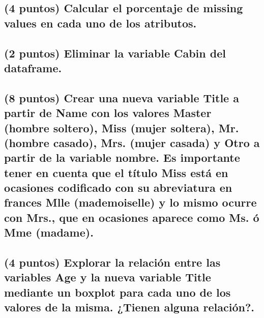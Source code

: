 \documentclass[]{article}
\begin{document}
\subsection{(4 puntos) Calcular el porcentaje de missing values en cada
uno de los
atributos.}\label{puntos-calcular-el-porcentaje-de-missing-values-en-cada-uno-de-los-atributos.}

\subsection{\texorpdfstring{(2 puntos) Eliminar la variable
\textbf{Cabin} del
dataframe.}{(2 puntos) Eliminar la variable Cabin del dataframe.}}\label{puntos-eliminar-la-variable-cabin-del-dataframe.}

\subsection{\texorpdfstring{(8 puntos) Crear una nueva variable
\textbf{Title} a partir de \textbf{Name} con los valores \textbf{Master}
(hombre soltero), \textbf{Miss} (mujer soltera), \textbf{Mr.} (hombre
casado), \textbf{Mrs.} (mujer casada) y Otro a partir de la variable
\textbf{nombre}. Es importante tener en cuenta que el título
\textbf{Miss} está en ocasiones codificado con su abreviatura en frances
\textbf{Mlle} (mademoiselle) y lo mismo ocurre con \textbf{Mrs.}, que en
ocasiones aparece como \textbf{Ms.} ó \textbf{Mme}
(madame).}{(8 puntos) Crear una nueva variable Title a partir de Name con los valores Master (hombre soltero), Miss (mujer soltera), Mr. (hombre casado), Mrs. (mujer casada) y Otro a partir de la variable nombre. Es importante tener en cuenta que el título Miss está en ocasiones codificado con su abreviatura en frances Mlle (mademoiselle) y lo mismo ocurre con Mrs., que en ocasiones aparece como Ms. ó Mme (madame).}}\label{puntos-crear-una-nueva-variable-title-a-partir-de-name-con-los-valores-master-hombre-soltero-miss-mujer-soltera-mr.-hombre-casado-mrs.-mujer-casada-y-otro-a-partir-de-la-variable-nombre.-es-importante-tener-en-cuenta-que-el-titulo-miss-esta-en-ocasiones-codificado-con-su-abreviatura-en-frances-mlle-mademoiselle-y-lo-mismo-ocurre-con-mrs.-que-en-ocasiones-aparece-como-ms.-o-mme-madame.}

\subsection{\texorpdfstring{(4 puntos) Explorar la relación entre las
variables \textbf{Age} y la nueva variable \textbf{Title} mediante un
boxplot para cada uno de los valores de la misma. ¿Tienen alguna
relación?.}{(4 puntos) Explorar la relación entre las variables Age y la nueva variable Title mediante un boxplot para cada uno de los valores de la misma. ¿Tienen alguna relación?.}}\label{puntos-explorar-la-relacion-entre-las-variables-age-y-la-nueva-variable-title-mediante-un-boxplot-para-cada-uno-de-los-valores-de-la-misma.-tienen-alguna-relacion.}
\end{document}
